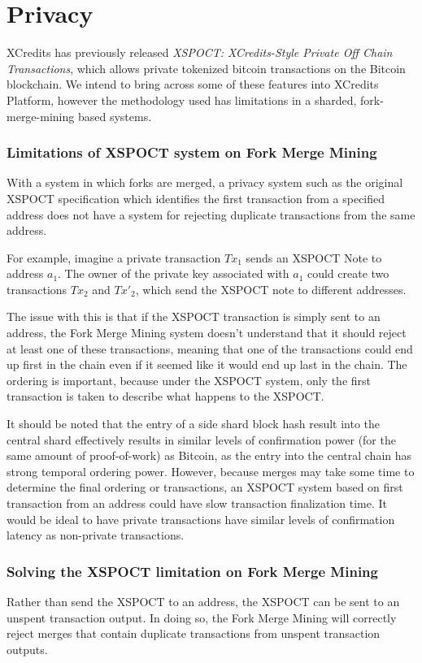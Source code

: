 \section{Privacy}
XCredits has previously released \textit{XSPOCT: XCredits-Style Private Off Chain Transactions}\cite{xspoct}, which allows private tokenized bitcoin transactions on the Bitcoin blockchain. We intend to bring across some of these features into XCredits Platform, however the methodology used has limitations in a sharded, fork-merge-mining based systems. 

\subsubsection{Limitations of XSPOCT system on Fork Merge Mining}
With a system in which forks are merged, a privacy system such as the original XSPOCT specification which identifies the first transaction from a specified address does not have a system for rejecting duplicate transactions from the same address. 

For example, imagine a private transaction $Tx_1$ sends an XSPOCT Note to address $a_1$. The owner of the private key associated with $a_1$ could create two transactions $Tx_2$ and $Tx'_2$, which send the XSPOCT note to different addresses. 

The issue with this is that if the XSPOCT transaction is simply sent to an address, the Fork Merge Mining system doesn't understand that it should reject at least one of these transactions, meaning that one of the transactions could end up first in the chain even if it seemed like it would end up last in the chain. The ordering is important, because under the XSPOCT system, only the first transaction is taken to describe what happens to the XSPOCT.

It should be noted that the entry of a side shard block hash result into the central shard effectively results in similar levels of confirmation power (for the same amount of proof-of-work) as Bitcoin, as the entry into the central chain has strong temporal ordering power. However, because merges may take some time to determine the final ordering or transactions, an XSPOCT system based on first transaction from an address could have slow transaction finalization time. It would be ideal to have private transactions have similar levels of confirmation latency as non-private transactions.

\subsubsection{Solving the XSPOCT limitation on Fork Merge Mining}
Rather than send the XSPOCT to an address, the XSPOCT can be sent to an unspent transaction output. In doing so, the Fork Merge Mining will correctly reject merges that contain duplicate transactions from unspent transaction outputs. 

